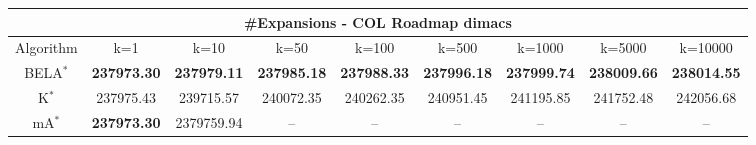 \begin{tabular}{c|cccccccc}\toprule
\multicolumn{9}{c}{#Expansions - COL Roadmap dimacs}\\ \midrule
Algorithm & k=1 & k=10 & k=50 & k=100 & k=500 & k=1000 & k=5000 & k=10000 \\ \midrule
BELA$^*$ & \textbf{237973.30} & \textbf{237979.11} & \textbf{237985.18} & \textbf{237988.33} & \textbf{237996.18} & \textbf{237999.74} & \textbf{238009.66} & \textbf{238014.55} \\
K$^*$ & 237975.43 & 239715.57 & 240072.35 & 240262.35 & 240951.45 & 241195.85 & 241752.48 & 242056.68 \\
mA$^*$ & \textbf{237973.30} & 2379759.94 & -- & -- & -- & -- & -- & -- \\ \bottomrule 
\end{tabular}

